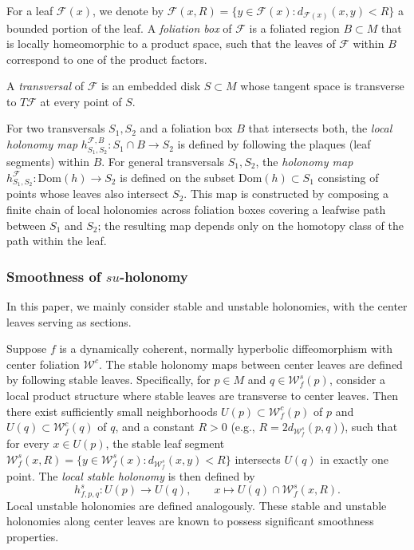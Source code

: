 \documentclass[11pt]{amsart}
\numberwithin{equation}{section}
\theoremstyle{plain}
\begin{document}
For a leaf $\mathcal{F}(x)$, we denote by $\mathcal{F}(x,R) = \{ y \in \mathcal{F}(x) : d_{\mathcal{F}(x)}(x,y) < R \}$ a bounded portion of the leaf. A \emph{foliation box} of $\mathcal{F}$ is a foliated region $B \subset M$ that is locally homeomorphic to a product space, such that the leaves of $\mathcal{F}$ within $B$ correspond to one of the product factors.

A \emph{transversal} of $\mathcal{F}$ is an embedded disk $S \subset M$ whose tangent space is transverse to \(T\mathcal F\) at every point
of \(S\).

For two transversals $S_1, S_2$ and a foliation box $B$ that intersects both, the \emph{local holonomy map} $h_{S_1, S_2}^{\mathcal{F}, B}: S_1 \cap B \to S_2$ is defined by following the plaques (leaf segments) within $B$. For general transversals $S_1, S_2$, the \emph{holonomy map} $h_{S_1, S_2}^{\mathcal{F}}: \mathrm{Dom}(h) \to S_2$ is defined on the subset $\mathrm{Dom}(h) \subset S_1$ consisting of points whose leaves also intersect $S_2$. This map is constructed by composing a finite chain of local holonomies across foliation boxes covering a leafwise path between $S_1$ and $S_2$; the resulting map depends only on the homotopy class of the path within the leaf.


\subsubsection{Smoothness of $su$-holonomy}\label{sec:suhol}
In this paper, we mainly consider stable and unstable holonomies, with the center leaves serving as sections.

Suppose $f$ is a dynamically coherent, normally hyperbolic diffeomorphism with center foliation $\mathcal{W}^c$. The stable holonomy maps between center leaves are defined by following stable leaves. Specifically, for $p \in M$ and $q \in \mathcal{W}^s_f(p)$, consider a local product structure where stable leaves are transverse to center leaves. Then there exist sufficiently small neighborhoods $U(p) \subset \mathcal{W}^c_f(p)$ of $p$ and $U(q) \subset \mathcal{W}^c_f(q)$ of $q$, and a constant $R > 0$ (e.g., $R = 2 d_{\mathcal{W}^s_f}(p,q)$), such that for every $x \in U(p)$, the stable leaf segment $\mathcal{W}^s_f(x, R) = \{ y \in \mathcal{W}^s_f(x) : d_{\mathcal{W}^s_f}(x,y) < R \}$ intersects $U(q)$ in exactly one point. The \emph{local stable holonomy} is then defined by
$$
h^s_{f,p,q}: U(p) \to U(q), \qquad x \mapsto U(q) \cap \mathcal{W}^s_f(x,R).
$$
Local unstable holonomies are defined analogously. These stable and unstable holonomies along center leaves are known to possess significant smoothness properties.
\end{document}

